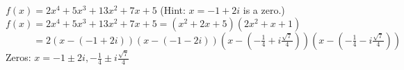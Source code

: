 {$f(x) = 2x^4+5x^3+13x^2+7x+5$ (Hint:  $x = -1+2i$ is a zero.)}
{$f(x) = 2x^4+5x^3+13x^2+7x+5 = \left(x^2+2x+5\right) \left(2x^2+x+1\right)$  \\
 $\phantom{f(x)} = 2 (x-(-1+2i))(x-(-1-2i))\left(x - \left(-\frac{1}{4} + i \frac{\sqrt{7}}{4}\right) \right)\left(x - \left(-\frac{1}{4} - i \frac{\sqrt{7}}{4}\right) \right) $\\
Zeros:  $x = -1 \pm 2i, -\frac{1}{4} \pm i \frac{\sqrt{7}}{4}$}